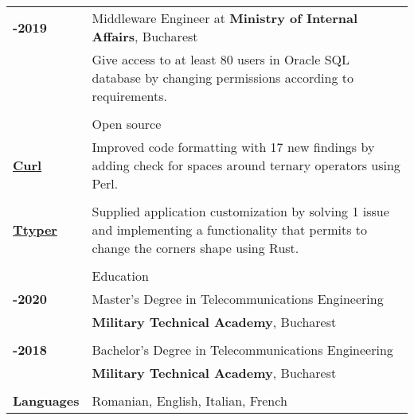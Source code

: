 \documentclass[a4paper,12pt]{article}
\begin{document}
\begin{tabular}{>{\raggedleft\bfseries\arraybackslash}p{3cm}|>{\raggedright\arraybackslash}p{15cm}}
  \\
  2018-2019 & Middleware Engineer at \textbf{Ministry of Internal Affairs}, Bucharest\\
  &\footnotesize{Give access to at least 80 users in Oracle SQL database by changing permissions according to requirements.}\\
  \\
  & Open source \\
    \href{https://github.com/curl/curl}{Curl} & \footnotesize{Improved code formatting with 17 new findings by adding check for spaces around ternary operators using Perl.}\\
    \\
    \href{https://github.com/max-niederman/ttyper}{Ttyper} & \footnotesize{Supplied application customization by solving 1 issue and implementing a functionality that permits to change the corners shape using Rust.}\\
    \\
    & Education\\
  2018-2020 & Master's Degree in Telecommunications Engineering \\
  & \textbf{Military Technical Academy}, Bucharest \\
  \\
  2014-2018 & Bachelor's Degree in Telecommunications Engineering \\
  & \textbf{Military Technical Academy}, Bucharest\\
  \\
    Languages & Romanian, English, Italian, French
\end{tabular}
\end{document}

